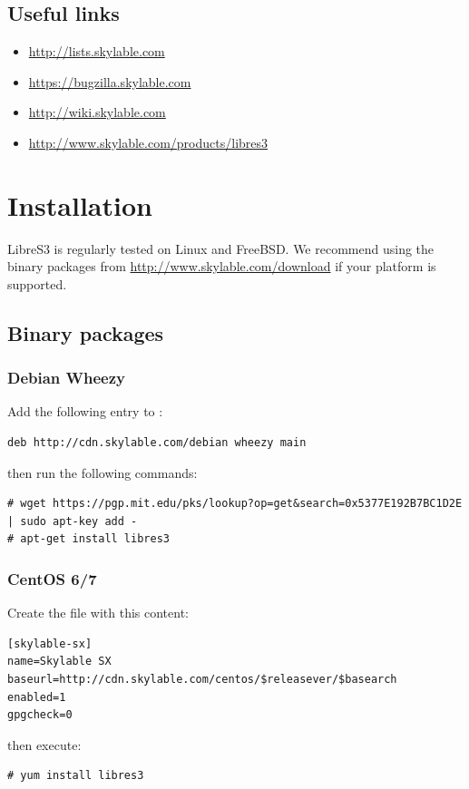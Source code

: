 \section*{Useful links}
\begin{itemize}
    \item \url{http://lists.skylable.com}
    \item \url{https://bugzilla.skylable.com}
    \item \url{http://wiki.skylable.com}
    \item \url{http://www.skylable.com/products/libres3}
\end{itemize}

\chapter{Installation}

LibreS3 is regularly tested on Linux and FreeBSD. We recommend using the
binary packages from \url{http://www.skylable.com/download} if your platform
is supported.

\section*{Binary packages}

\subsection{Debian Wheezy}
Add the following entry to :
\begin{lstlisting}
deb http://cdn.skylable.com/debian wheezy main
\end{lstlisting}
then run the following commands:
\begin{lstlisting}
# wget https://pgp.mit.edu/pks/lookup?op=get&search=0x5377E192B7BC1D2E | sudo apt-key add -
# apt-get install libres3
\end{lstlisting}

\subsection{CentOS 6/7}
Create the file  with this content:
\begin{lstlisting}
[skylable-sx]
name=Skylable SX
baseurl=http://cdn.skylable.com/centos/$releasever/$basearch
enabled=1
gpgcheck=0
\end{lstlisting}
then execute:
\begin{lstlisting}
# yum install libres3
\end{lstlisting}

